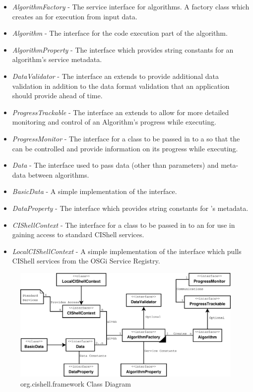 \begin{itemize}
  \item \textit{AlgorithmFactory} - The service interface for algorithms.
  A factory class which creates an  for execution from input
  data.
  \item \textit{Algorithm} - The interface for the code execution part of the
  algorithm.
  \item \textit{AlgorithmProperty} - The interface which provides string
  constants for an algorithm's service metadata.
  \item \textit{DataValidator} - The interface an 
  extends to provide additional data validation in addition to the data format validation
  that an application should provide ahead of time.
  \item \textit{ProgressTrackable} - The interface an  extends
  to allow for more detailed monitoring and control of an Algorithm's progress while
  executing.
  \item \textit{ProgressMonitor} - The interface for a class to be passed in to
  a   so that the 
  can be controlled and provide information on its progress while executing.
  \item \textit{Data} - The interface used to pass data (other than
  parameters) and meta-data between algorithms.
  \item \textit{BasicData} - A simple implementation of the 
  interface.
  \item \textit{DataProperty} - The interface which provides string constants
  for 's metadata.
  \item \textit{CIShellContext} - The interface for a class to be passed in to
  an  for use in gaining access to standard CIShell
  services.
  \item \textit{LocalCIShellContext} - A simple implementation of the
   interface which pulls CIShell services from the OSGi
  Service Registry.
\end{itemize}

\begin{figure}[htb!]
\centering
\includegraphics[width=150mm]{../img/cishellInteraction.pdf}
\caption{org.cishell.framework Class Diagram}
\label{fig:cishellInteraction}
\end{figure}


